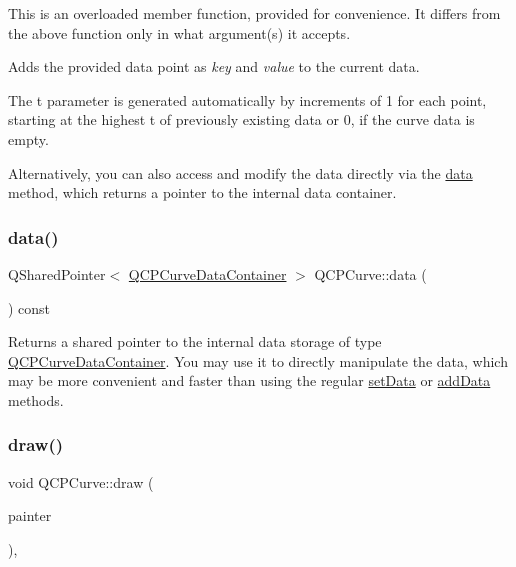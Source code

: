 This is an overloaded member function, provided for convenience. It differs from the above function only in what argument(s) it accepts.

Adds the provided data point as {\itshape key} and {\itshape value} to the current data.

The t parameter is generated automatically by increments of 1 for each point, starting at the highest t of previously existing data or 0, if the curve data is empty.

Alternatively, you can also access and modify the data directly via the \hyperlink{class_q_c_p_curve_a761492fd00b1ab7cb18ce23c118c6c60}{data} method, which returns a pointer to the internal data container. \mbox{\label{class_q_c_p_curve_a761492fd00b1ab7cb18ce23c118c6c60}} 
\subsubsection{\texorpdfstring{data()}{data()}}
{\footnotesize\ttfamily Q\+Shared\+Pointer$<$ \hyperlink{qcustomplot_8h_aaeee80d5664ea91beb9d7968790d0e65}{Q\+C\+P\+Curve\+Data\+Container} $>$ Q\+C\+P\+Curve\+::data (\begin{DoxyParamCaption}{ }\end{DoxyParamCaption}) const\hspace{0.3cm}{\ttfamily [inline]}}

Returns a shared pointer to the internal data storage of type \hyperlink{qcustomplot_8h_aaeee80d5664ea91beb9d7968790d0e65}{Q\+C\+P\+Curve\+Data\+Container}. You may use it to directly manipulate the data, which may be more convenient and faster than using the regular \hyperlink{class_q_c_p_curve_a41246850d2e080bc57183ca19cd4135e}{set\+Data} or \hyperlink{class_q_c_p_curve_a73edf394b94f3f24f07518e30565a07f}{add\+Data} methods. \mbox{\label{class_q_c_p_curve_ac199d41d23865cd68bd7b598308a4433}} 
\subsubsection{\texorpdfstring{draw()}{draw()}}
{\footnotesize\ttfamily void Q\+C\+P\+Curve\+::draw (\begin{DoxyParamCaption}\item[{\hyperlink{class_q_c_p_painter}{Q\+C\+P\+Painter} $\ast$}]{painter }\end{DoxyParamCaption})\hspace{0.3cm}{\ttfamily [protected]}, {\ttfamily [virtual]}}




